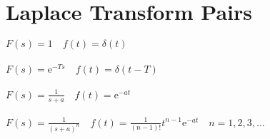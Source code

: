 \documentclass[a4paper, 10pt]{scrartcl}
\newcommand*\euler{\mathrm{e}}
\begin{document}
\section*{Laplace Transform Pairs}
$F(s) = 1 \quad f(t) = \delta(t)$\\
\\
$F(s) = \euler^{-Ts} \quad f(t) = \delta(t - T)$\\
\\
$F(s) = \frac{1}{s + a} \quad f(t) = \euler^{-at}$\\
\\
$F(s) = \frac{1}{(s + a)^{n}} \quad f(t) = \frac{1}{(n - 1)!}t^{n - 1}\euler^{-at} \quad n = 1, 2, 3,\dots $\\
\end{document}

